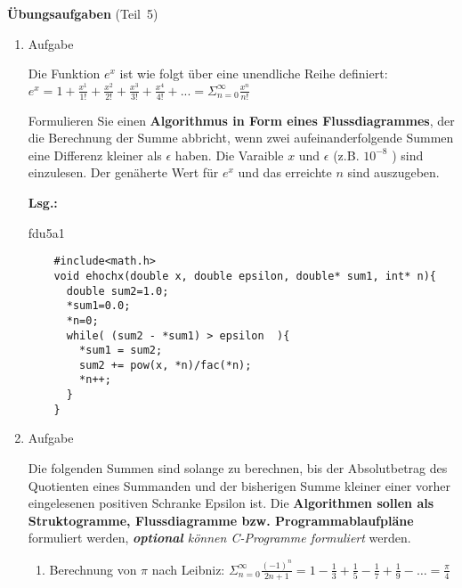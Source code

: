 \documentclass[12pt,a4paper,ngerman]{scrreprt}
\newcommand{\Lsg}{\par \textbf{Lsg.: } \hfill}
\begin{document}
\large{\textbf{Übungsaufgaben} (Teil~5)}

\begin{enumerate}

\item Aufgabe %

Die Funktion $ e^x $ ist wie folgt über eine unendliche Reihe definiert: \\

\begin{math}
e^x = 1 + \frac{x^1}{1!} + \frac{x^2}{2!} + \frac{x^3}{3!} + \frac{x^4}{4!} + ...
= \Sigma_{n=0}^{\infty} \frac{x^n}{n!}
\end{math}

\par Formulieren Sie einen \textbf{Algorithmus in Form eines Flussdiagrammes}, der die Berechnung der Summe abbricht, wenn zwei aufeinanderfolgende Summen eine Differenz kleiner als $\epsilon$ haben.
Die Varaible $x$ und $\epsilon$ (z.B. $10^{-8}$ ) sind einzulesen. Der genäherte Wert für $ e^x $ und das erreichte $ n $ sind auszugeben.

\Lsg


{fdu5a1}

\begin{lstlisting}
    #include<math.h>
    void ehochx(double x, double epsilon, double* sum1, int* n){
      double sum2=1.0;
      *sum1=0.0;
      *n=0;
      while( (sum2 - *sum1) > epsilon  ){
        *sum1 = sum2;
        sum2 += pow(x, *n)/fac(*n);
        *n++;
      }
    }
\end{lstlisting}

\item Aufgabe %

Die folgenden Summen sind solange zu berechnen, bis der Absolutbetrag des Quotienten eines Summanden und der bisherigen Summe kleiner einer vorher eingelesenen positiven Schranke Epsilon ist.
Die \textbf{Algorithmen sollen als Struktogramme, Flussdiagramme bzw. Programmablaufpläne} formuliert werden, \textit{\textbf{optional} können C-Programme formuliert} werden.

\begin{enumerate}

\item Berechnung von $\pi$ nach Leibniz: $ \Sigma_{n=0}^{\infty} \frac{(-1)^n}{2n+1} = 1-\frac{1}{3}+\frac{1}{5}-\frac{1}{7}+\frac{1}{9}-\ldots=\frac{\pi}{4} $


\end{enumerate}
\end{enumerate}
\end{document}

